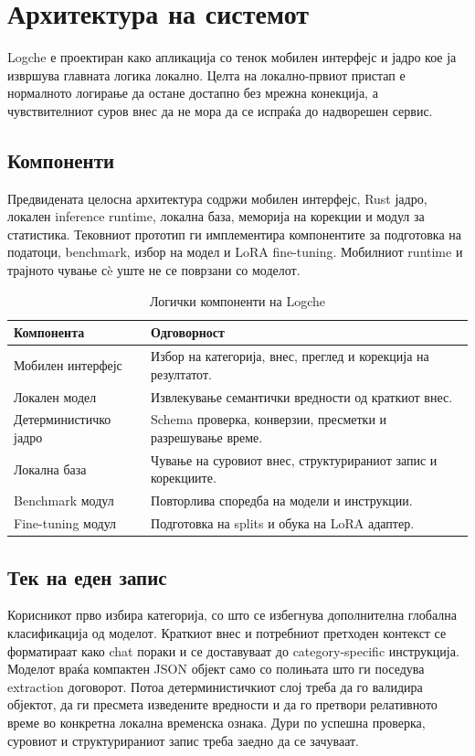 \chapter{Архитектура на системот}

Logche е проектиран како апликација со тенок мобилен интерфејс и јадро кое ја извршува главната логика локално.
Целта на локално-првиот пристап е нормалното логирање да остане достапно без мрежна конекција, а чувствителниот суров внес да не мора да се испраќа до надворешен сервис.

\section{Компоненти}

Предвидената целосна архитектура содржи мобилен интерфејс, Rust јадро, локален inference runtime, локална база, меморија на корекции и модул за статистика.
Тековниот прототип ги имплементира компонентите за подготовка на податоци, benchmark, избор на модел и LoRA fine-tuning.
Мобилниот runtime и трајното чување сè уште не се поврзани со моделот.

\begin{table}[ht]
  \centering
  \small
  \begin{tabular}{p{}p{}}
    \toprule
    Компонента & Одговорност \\
    \midrule
    Мобилен интерфејс & Избор на категорија, внес, преглед и корекција на резултатот. \\
    Локален модел & Извлекување семантички вредности од краткиот внес. \\
    Детерминистичко јадро & Schema проверка, конверзии, пресметки и разрешување време. \\
    Локална база & Чување на суровиот внес, структурираниот запис и корекциите. \\
    Benchmark модул & Повторлива споредба на модели и инструкции. \\
    Fine-tuning модул & Подготовка на splits и обука на LoRA адаптер. \\
    \bottomrule
  \end{tabular}
  \caption{Логички компоненти на Logche}
\end{table}

\section{Тек на еден запис}

Корисникот прво избира категорија, со што се избегнува дополнителна глобална класификација од моделот.
Краткиот внес и потребниот претходен контекст се форматираат како chat пораки и се доставуваат до category-specific инструкција.
Моделот враќа компактен JSON објект само со полињата што ги поседува extraction договорот.
Потоа детерминистичкиот слој треба да го валидира објектот, да ги пресмета изведените вредности и да го претвори релативното време во конкретна локална временска ознака.
Дури по успешна проверка, суровиот и структурираниот запис треба заедно да се зачуваат.


